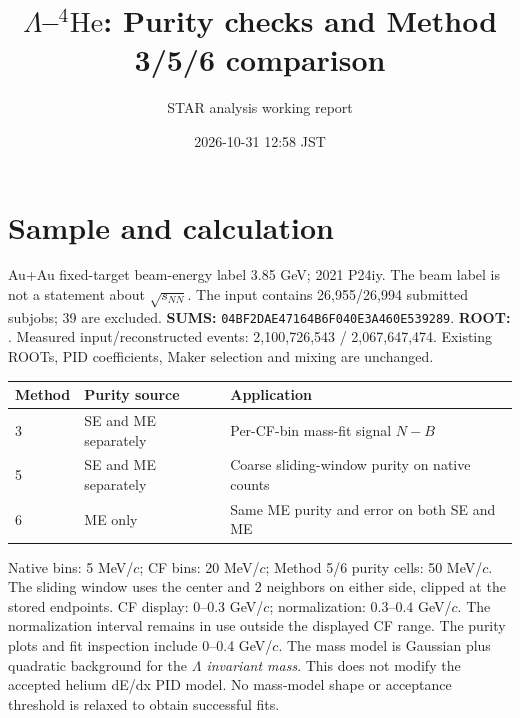 \documentclass[10pt,a4paper]{article}
\title{$\Lambda$--$^{4}\mathrm{He}$: Purity checks and Method 3/5/6 comparison}
\author{STAR analysis working report}
\date{2026-10-31 12:58 JST}
\begin{document}
\maketitle
\section{Sample and calculation}
Au+Au fixed-target beam-energy label 3.85 GeV; 2021 P24iy. The beam label is not a statement about $\sqrt{s_{NN}}$. The input contains 26,955/26,994 submitted subjobs; 39 are excluded.
\textbf{SUMS:} \texttt{04BF2DAE47164B6F040E3A460E539289}. \textbf{ROOT:} .
Measured input/reconstructed events: 2,100,726,543 / 2,067,647,474. Existing ROOTs, PID coefficients, Maker selection and mixing are unchanged.
\begin{center}\begin{tabular}{lll}\toprule Method & Purity source & Application\\\midrule
3 & SE and ME separately & Per-CF-bin mass-fit signal $N-B$\\
5 & SE and ME separately & Coarse sliding-window purity on native counts\\
6 & ME only & Same ME purity and error on both SE and ME\\\bottomrule\end{tabular}\end{center}
Native bins: 5 MeV/$c$; CF bins: 20 MeV/$c$; Method 5/6 purity cells: 50 MeV/$c$. The sliding window uses the center and 2 neighbors on either side, clipped at the stored endpoints.
CF display: 0--0.3 GeV/$c$; normalization: 0.3--0.4 GeV/$c$. The normalization interval remains in use outside the displayed CF range. The purity plots and fit inspection include 0--0.4 GeV/$c$.
The mass model is Gaussian plus quadratic background for the \emph{$\Lambda$ invariant mass}. This does not modify the accepted helium dE/dx PID model. No mass-model shape or acceptance threshold is relaxed to obtain successful fits.
\end{document}
